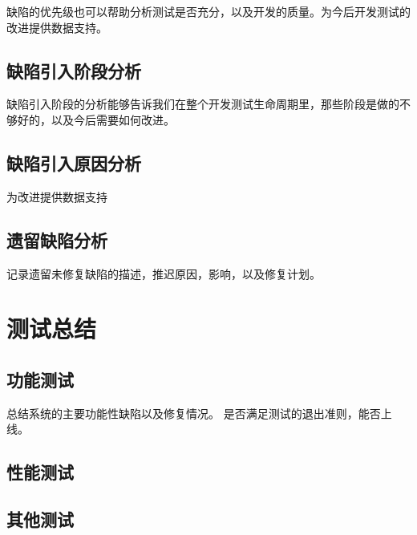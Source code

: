 \documentclass[hyperref, a4paper]{ctexart}
\begin{document}
缺陷的优先级也可以帮助分析测试是否充分，以及开发的质量。为今后开发测试的改进提供数据支持。

\hypertarget{ux7f3aux9677ux5f15ux5165ux9636ux6bb5ux5206ux6790}{%
\subsection{缺陷引入阶段分析}\label{ux7f3aux9677ux5f15ux5165ux9636ux6bb5ux5206ux6790}}

缺陷引入阶段的分析能够告诉我们在整个开发测试生命周期里，那些阶段是做的不够好的，以及今后需要如何改进。

\hypertarget{ux7f3aux9677ux5f15ux5165ux539fux56e0ux5206ux6790}{%
\subsection{缺陷引入原因分析}\label{ux7f3aux9677ux5f15ux5165ux539fux56e0ux5206ux6790}}

为改进提供数据支持

\hypertarget{ux9057ux7559ux7f3aux9677ux5206ux6790}{%
\subsection{遗留缺陷分析}\label{ux9057ux7559ux7f3aux9677ux5206ux6790}}

记录遗留未修复缺陷的描述，推迟原因，影响，以及修复计划。

\hypertarget{ux6d4bux8bd5ux603bux7ed3}{%
\section{测试总结}\label{ux6d4bux8bd5ux603bux7ed3}}

\hypertarget{ux529fux80fdux6d4bux8bd5}{%
\subsection{功能测试}\label{ux529fux80fdux6d4bux8bd5}}

总结系统的主要功能性缺陷以及修复情况。
是否满足测试的退出准则，能否上线。

\hypertarget{ux6027ux80fdux6d4bux8bd5-1}{%
\subsection{性能测试}\label{ux6027ux80fdux6d4bux8bd5-1}}

\hypertarget{ux5176ux4ed6ux6d4bux8bd5}{%
\subsection{其他测试}\label{ux5176ux4ed6ux6d4bux8bd5}}
\end{document}
